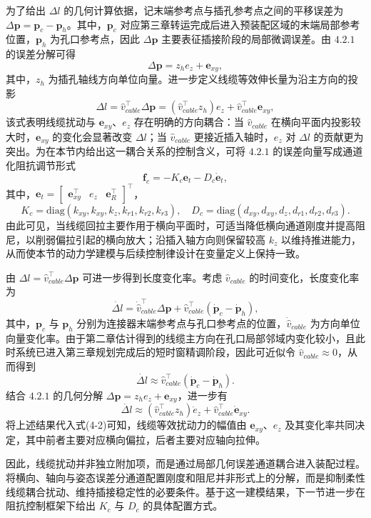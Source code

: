 为了给出 $\Delta l$ 的几何计算依据，记末端参考点与插孔参考点之间的平移误差为 $\Delta\mathbf{p}=\mathbf{p}_{c}-\mathbf{p}_{h}$。其中，$\mathbf{p}_{c}$ 对应第三章转运完成后进入预装配区域的末端局部参考位置，$\mathbf{p}_{h}$ 为孔口参考点，因此 $\Delta\mathbf{p}$ 主要表征插接阶段的局部微调误差。由 $4.2.1$ 的误差分解可得
$$
\Delta\mathbf{p}=z_{h}e_{z}+\mathbf{e}_{xy},
$$
其中，$z_{h}$ 为插孔轴线方向单位向量。进一步定义线缆等效伸长量为沿主方向的投影
$$
\Delta l=\hat v_{cable}^{\top}\Delta\mathbf{p}
=\left(\hat v_{cable}^{\top}z_{h}\right)e_{z}+\hat v_{cable}^{\top}\mathbf{e}_{xy},
$$
该式表明线缆扰动与 $\mathbf{e}_{xy}$、$e_{z}$ 存在明确的方向耦合：当 $\hat v_{cable}$ 在横向平面内投影较大时，$\mathbf{e}_{xy}$ 的变化会显著改变 $\Delta l$；当 $\hat v_{cable}$ 更接近插入轴时，$e_{z}$ 对 $\Delta l$ 的贡献更为突出。为在本节内给出这一耦合关系的控制含义，可将 $4.2.1$ 的误差向量写成通道化阻抗调节形式
$$
\mathbf{f}_{c}=-K_{c}\mathbf{e}_{t}-D_{c}\dot{\mathbf{e}}_{t},
$$
其中，$\mathbf{e}_{t}=\begin{bmatrix}\mathbf{e}_{xy}^{\top} & e_{z} & \mathbf{e}_{R}^{\top}\end{bmatrix}^{\top}$，
$$
K_{c}=\mathrm{diag}(k_{xy},k_{xy},k_{z},k_{r1},k_{r2},k_{r3}),\quad
D_{c}=\mathrm{diag}(d_{xy},d_{xy},d_{z},d_{r1},d_{r2},d_{r3}).
$$
由此可见，当线缆回拉主要作用于横向平面时，可适当降低横向通道刚度并提高阻尼，以削弱偏拉引起的横向放大；沿插入轴方向则保留较高 $k_z$ 以维持推进能力，从而使本节的动力学建模与后续控制律设计在变量定义上保持一致。

由 $\Delta l=\hat v_{cable}^{\top}\Delta\mathbf{p}$ 可进一步得到长度变化率。考虑 $\hat v_{cable}$ 的时间变化，长度变化率为
$$
\dot{\Delta l}=\dot{\hat v}_{cable}^{\top}\Delta\mathbf{p}+\hat v_{cable}^{\top}\left(\dot{\mathbf{p}}_{c}-\dot{\mathbf{p}}_{h}\right),
$$
其中，$\mathbf{p}_{c}$ 与 $\mathbf{p}_{h}$ 分别为连接器末端参考点与孔口参考点的位置，$\dot{\hat v}_{cable}$ 为方向单位向量变化率。由于第二章估计得到的线缆主方向在孔口局部邻域内变化较小，且此时系统已进入第三章规划完成后的短时窗精调阶段，因此可近似令 $\dot{\hat v}_{cable}\approx 0$，从而得到
$$
\dot{\Delta l}\approx \hat v_{cable}^{\top}\left(\dot{\mathbf{p}}_{c}-\dot{\mathbf{p}}_{h}\right).
$$
结合 $4.2.1$ 的几何分解 $\Delta\mathbf{p}=z_{h}e_{z}+\mathbf{e}_{xy}$，进一步有
$$
\dot{\Delta l}\approx \left(\hat v_{cable}^{\top}z_{h}\right)\dot e_{z}+\hat v_{cable}^{\top}\dot{\mathbf{e}}_{xy}.
$$
将上述结果代入式(4-2)可知，线缆等效扰动力的幅值由 $\mathbf{e}_{xy}$、$e_{z}$ 及其变化率共同决定，其中前者主要对应横向偏拉，后者主要对应轴向拉伸。

因此，线缆扰动并非独立附加项，而是通过局部几何误差通道耦合进入装配过程。将横向、轴向与姿态误差分通道配置刚度和阻尼并非形式上的分解，而是抑制柔性线缆耦合扰动、维持插接稳定性的必要条件。基于这一建模结果，下一节进一步在阻抗控制框架下给出 $K_c$ 与 $D_c$ 的具体配置方式。

